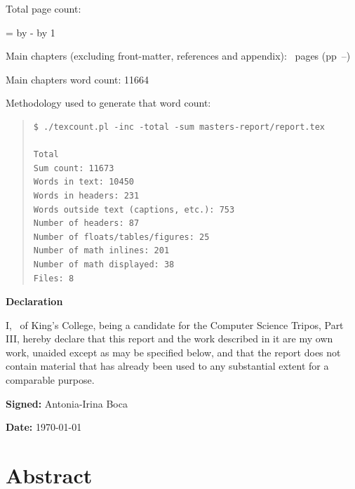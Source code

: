 \documentclass[12pt,a4paper]{report}
\newif\ifsubmission %
\newcommand{\college}{King's College}
\newcommand{\course}{Computer Science Tripos, Part III}
\begin{document}
\begin{sffamily}
\newpage

Total page count: \pageref{lastpage}

\makeatletter
\@tempcnta=\relax%
\advance\@tempcnta by -%
\advance\@tempcnta by 1%
\xdef\contentpages{\the\@tempcnta}%
\makeatother

Main chapters (excluding front-matter, references and appendix):
\contentpages~pages
(pp~\pageref{firstcontentpage}--\pageref{lastcontentpage})

Main chapters word count: 11664

Methodology used to generate that word count:

\begin{quote}
\begin{verbatim}
$ ./texcount.pl -inc -total -sum masters-report/report.tex

Total
Sum count: 11673
Words in text: 10450
Words in headers: 231
Words outside text (captions, etc.): 753
Number of headers: 87
Number of floats/tables/figures: 25
Number of math inlines: 201
Number of math displayed: 38
Files: 8
\end{verbatim}
\end{quote}

\end{sffamily}

\vspace{\fill}
\onehalfspacing
\ifsubmission\else\makeatletter
\textbf{\Huge Declaration}
\vspace{40pt}

I, \@author\ of \college, being a candidate for the \course, hereby
declare that this report and the work described in it are my own work,
unaided except as may be specified below, and that the report does not
contain material that has already been used to any substantial extent
for a comparable purpose.


\bigskip 
\textbf{Signed:} Antonia-Irina Boca

\bigskip
\textbf{Date:} \today
\vspace{\fill}
\makeatother\fi

\chapter*{Abstract}
\end{document}
